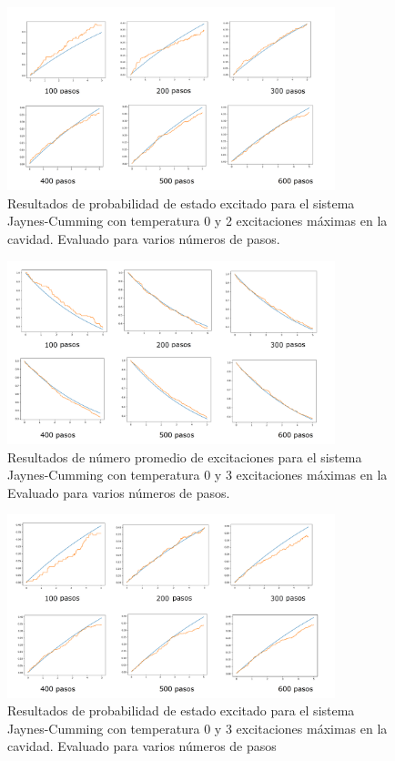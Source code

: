 \documentclass{book}
\begin{document}
\begin{figure}[ht]
    \includegraphics[width=0.85\textwidth]{test1_T0_pobe.png}
    \caption{Resultados de probabilidad de estado excitado para el sistema Jaynes-Cumming con temperatura 0 y 2 excitaciones máximas en la cavidad. Evaluado para varios números de pasos.}
\end{figure}

\begin{figure}[ht]
    \includegraphics[width=0.85\textwidth]{test2_T0_pob0.png}
    \caption{Resultados de número promedio de excitaciones para el sistema Jaynes-Cumming con temperatura 0 y 3 excitaciones máximas en la  Evaluado para varios números de pasos.}
\end{figure}

\begin{figure}[ht]
    \includegraphics[width=0.85\textwidth]{test2_T0_pobe.png}
    \caption{Resultados de probabilidad de estado excitado para el sistema Jaynes-Cumming con temperatura 0 y  3 excitaciones máximas en la cavidad. Evaluado para varios números de pasos }
\end{figure}
\end{document}

